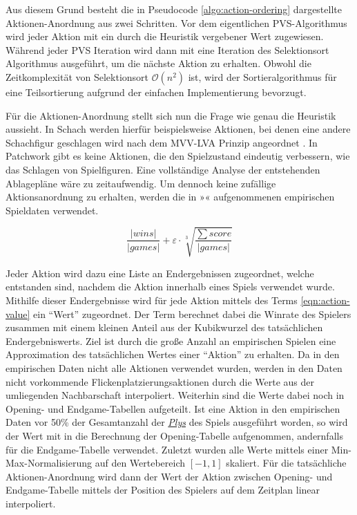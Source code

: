 Aus diesem Grund besteht die in Pseudocode \ref{algo:action-ordering} dargestellte Aktionen-Anordnung aus zwei Schritten. Vor dem eigentlichen \ac{PVS}-Algorithmus wird jeder Aktion mit  ein durch die Heuristik vergebener Wert zugewiesen. Während jeder \ac{PVS} Iteration wird dann mit  eine Iteration des Selektionsort Algorithmus ausgeführt, um die nächste Aktion zu erhalten. Obwohl die Zeitkomplexität von Selektionsort $\mathcal{O}\left(n^2\right)$ ist, wird der Sortieralgorithmus für eine Teilsortierung aufgrund der einfachen Implementierung bevorzugt.

Für die Aktionen-Anordnung stellt sich nun die Frage wie genau die Heuristik aussieht. In Schach werden hierfür beispielsweise Aktionen, bei denen eine andere Schachfigur geschlagen wird nach dem \ac{MVV-LVA} Prinzip angeordnet \cite[S. 72]{2002.FPGAMoveGenerator}. In Patchwork gibt es keine Aktionen, die den Spielzustand eindeutig verbessern, wie das Schlagen von Spielfiguren. Eine vollständige Analyse der entstehenden Ablagepläne wäre zu zeitaufwendig. Um dennoch keine zufällige Aktionsanordnung zu erhalten, werden die in »« aufgenommenen empirischen Spieldaten verwendet.

\vspace*{-0.1cm}
\begin{equation}
    \label{eqn:action-value}
    \frac{|wins|}{|games|} + \varepsilon \cdot \sqrt[3]{\frac{\sum score}{|games|}}
\end{equation}

Jeder Aktion wird dazu eine Liste an Endergebnissen zugeordnet, welche entstanden sind, nachdem die Aktion innerhalb eines Spiels verwendet wurde. Mithilfe dieser Endergebnisse wird für jede Aktion mittels des Terms \ref{eqn:action-value} ein \enquote{Wert} zugeordnet. Der Term berechnet dabei die Winrate des Spielers zusammen mit einem kleinen Anteil aus der Kubikwurzel des tatsächlichen Endergebniswerts. Ziel ist durch die große Anzahl an empirischen Spielen eine Approximation des tatsächlichen Wertes einer \enquote{Aktion} zu erhalten. Da in den empirischen Daten nicht alle Aktionen verwendet wurden, werden in den Daten nicht vorkommende Flickenplatzierungsaktionen durch die Werte aus der umliegenden Nachbarschaft interpoliert. Weiterhin sind die Werte dabei noch in Opening- und Endgame-Tabellen aufgeteilt. Ist eine Aktion in den empirischen Daten vor 50\% der Gesamtanzahl der \hyperref[text:ply]{\emph{Plys}} des Spiels ausgeführt worden, so wird der Wert mit in die Berechnung der Opening-Tabelle aufgenommen, andernfalls für die Endgame-Tabelle verwendet. Zuletzt wurden alle Werte mittels einer Min-Max-Normalisierung auf den Wertebereich $\left[-1, 1\right]$ skaliert. Für die tatsächliche Aktionen-Anordnung wird dann der Wert der Aktion zwischen Opening- und Endgame-Tabelle mittels der Position des Spielers auf dem Zeitplan linear interpoliert.

